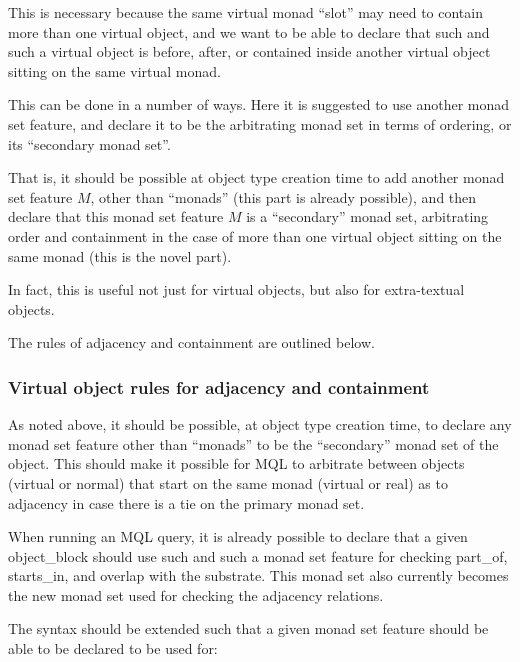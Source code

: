 \documentclass[a4paper,12pt]{article}
\begin{document}
\begin{enumerate}
        This is necessary because the same virtual monad ``slot'' may
        need to contain more than one virtual object, and we want to
        be able to declare that such and such a virtual object is
        before, after, or contained inside another virtual object
        sitting on the same virtual monad.

        This can be done in a number of ways.  Here it is suggested to
        use another monad set feature, and declare it to be the
        arbitrating monad set in terms of ordering, or its ``secondary
        monad set''.

        That is, it should be possible at object type creation time to
        add another monad set feature $M$, other than ``monads''
        (this part is already possible), and then declare that this
        monad set feature $M$ is a ``secondary'' monad set,
        arbitrating order and containment in the case of more than one
        virtual object sitting on the same monad (this is the novel
        part).

        In fact, this is useful not just for virtual objects, but also
        for extra-textual objects.

        The rules of adjacency and containment are outlined below.
      
\end{enumerate}

\subsubsection{Virtual object rules for adjacency and containment}

As noted above, it should be possible, at object type creation time,
to declare any monad set feature other than ``monads'' to be the
``secondary'' monad set of the object.  This should make it possible
for MQL to arbitrate between objects (virtual or normal) that start on
the same monad (virtual or real) as to adjacency in case there is a
tie on the primary monad set.

When running an MQL query, it is already possible to declare that a
given object\_block should use such and such a monad set feature for
checking part\_of, starts\_in, and overlap with the substrate.  This
monad set also currently becomes the new monad set used for checking
the adjacency relations.

The syntax should be extended such that a given monad set feature should
be able to be declared to be used for:
\end{document}
